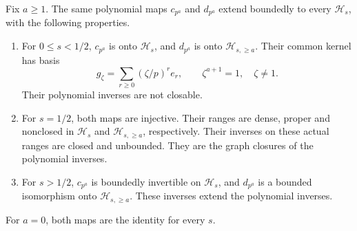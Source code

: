 \begin{theorem}
\label{v4-arith:hecke:thm:weighted}
Fix $a\geq1$.
The same polynomial maps $c_{p^a}$ and $d_{p^a}$ extend boundedly
to every $\mathcal H_s$, with the following properties.
\begin{enumerate}
\item For $0\leq s<1/2$, $c_{p^a}$ is onto $\mathcal H_s$,
and $d_{p^a}$ is onto $\mathcal H_{s,\geq a}$.
Their common kernel has basis
\[
 g_\zeta=\sum_{r\geq0}(\zeta/p)^re_r,
 \qquad \zeta^{a+1}=1,\quad\zeta\ne1.
\]
Their polynomial inverses are not closable.
\item For $s=1/2$, both maps are injective.
Their ranges are dense, proper and nonclosed in $\mathcal H_s$
and $\mathcal H_{s,\geq a}$, respectively.
Their inverses on these actual ranges are closed and unbounded.
They are the graph closures of the polynomial inverses.
\item For $s>1/2$, $c_{p^a}$ is boundedly invertible on $\mathcal H_s$,
and $d_{p^a}$ is a bounded isomorphism onto $\mathcal H_{s,\geq a}$.
These inverses extend the polynomial inverses.
\end{enumerate}
For $a=0$, both maps are the identity for every $s$.
\end{theorem}
